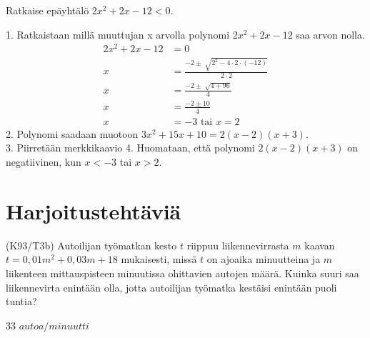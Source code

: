 \begin{esimerkki}
Ratkaise epäyhtälö $2x^2+2x-12<0$. 
\end{esimerkki}
1. Ratkaistaan millä muuttujan x arvolla polynomi $2x^2+2x-12$ saa arvon nolla.
\begin{align*}
2x^2+2x-12&=0 \\
x&=\frac{-2 \pm \sqrt[]{2^2-4 \cdot 2 \cdot (-12)}}{2 \cdot 2} \\
x&=\frac{-2 \pm \sqrt[]{4+96}}{4} \\
x&=\frac{-2 \pm 10}{4} \\
x&=-3 \text{ tai } x = 2
\end{align*}
2. Polynomi saadaan muotoon $3x^2+15x+10=2(x-2)(x+3)$.  \\
3. Piirretään merkkikaavio
4. Huomataan, että polynomi $2(x-2)(x+3)$ on negatiivinen, kun $x<-3$ tai $x>2$. 
\section{Harjoitustehtäviä}
\begin{tehtava}
(K93/T3b) Autoilijan työmatkan kesto $t$ riippuu liikennevirrasta $m$ kaavan 
        $t=0,01m^2+0,03m+18$ mukaisesti, missä $t$ on ajoaika minuutteina ja $m$ liikenteen mittauspisteen minuutissa ohittavien autojen määrä. Kuinka suuri saa liikennevirta enintään olla, jotta autoilijan työmatka kestäisi enintään puoli tuntia?
\begin{vastaus}
        33 $autoa/minuutti$
    \end{vastaus}
\end{tehtava}
